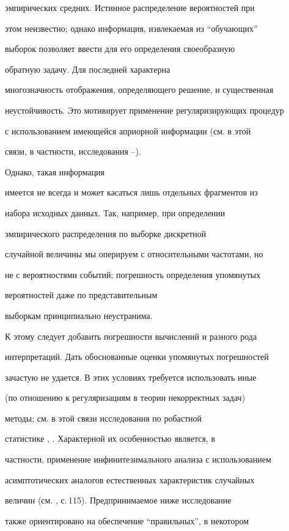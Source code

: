 эмпирических средних. Истинное распределение вероятностей при


этом неизвестно; однако информация, извлекаемая из ``обучающих''


выборок позволяет ввести для его определения своеобразную


обратную задачу. Для последней характерна


многозначность отображения, определяющего решение, и существенная


неустойчивость. Это мотивирует применение регуляризирующих процедур


с использованием имеющейся априорной информации (см. в этой


связи, в частности, исследования \cite{Ti1}--\cite{Vas}).


Однако, такая информация


имеется не всегда и может касаться лишь отдельных фрагментов из


набора исходных данных. Так, например, при определении


эмпирического распределения по выборке дискретной


случайной величины мы оперируем с относительными частотами, но


не с вероятностями событий; погрешность определения упомянутых


вероятностей даже по представительным


выборкам принципиально неустранима.


К этому следует добавить погрешности вычислений и разного рода


интерпретаций. Дать обоснованные оценки упомянутых погрешностей


зачастую не удается. В этих условиях требуется использовать иные


(по отношению к регуляризациям в теории некорректных задач)


методы; см. в этой связи исследования по робастной


статистике \cite{Hub}, \cite{Ham}. Характерной их особенностью является, в


частности, применение инфинитезимального анализа с использованием


асимптотических аналогов естественных характеристик случайных


величин (см. \cite{Ham}, с.\,115). Предпринимаемое ниже исследование


также ориентировано на обеспечение ``правильных'', в некотором


